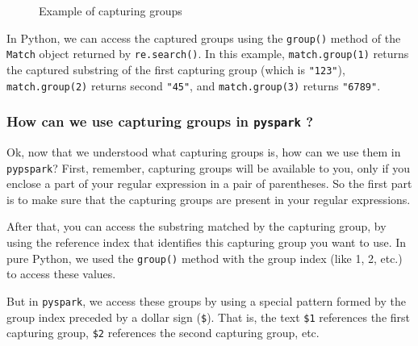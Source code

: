 \documentclass[
  11pt,
  letterpaper,
  DIV=11,
  numbers=noendperiod]{scrreprt}
\begin{document}
\begin{figure}


\caption{\label{fig-substring-capturing-groups}Example of capturing
groups}

\end{figure}%

In Python, we can access the captured groups using the \texttt{group()}
method of the \texttt{Match} object returned by \texttt{re.search()}. In
this example, \texttt{match.group(1)} returns the captured substring of
the first capturing group (which is \texttt{"123"}),
\texttt{match.group(2)} returns second \texttt{"45"}, and
\texttt{match.group(3)} returns \texttt{"6789"}.

\subsubsection{\texorpdfstring{How can we use capturing groups in
\texttt{pyspark}
?}{How can we use capturing groups in pyspark ?}}\label{how-can-we-use-capturing-groups-in-pyspark}

Ok, now that we understood what capturing groups is, how can we use them
in \texttt{pypspark}? First, remember, capturing groups will be
available to you, only if you enclose a part of your regular expression
in a pair of parentheses. So the first part is to make sure that the
capturing groups are present in your regular expressions.

After that, you can access the substring matched by the capturing group,
by using the reference index that identifies this capturing group you
want to use. In pure Python, we used the \texttt{group()} method with
the group index (like 1, 2, etc.) to access these values.

But in \texttt{pyspark}, we access these groups by using a special
pattern formed by the group index preceded by a dollar sign
(\texttt{\$}). That is, the text \texttt{\$1} references the first
capturing group, \texttt{\$2} references the second capturing group,
etc.
\end{document}
